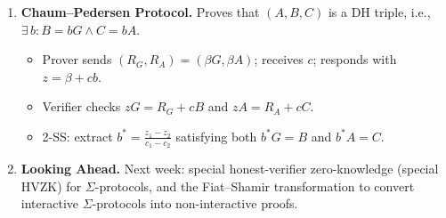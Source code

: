 \documentclass[11pt]{article}
\theoremstyle{plain}
\theoremstyle{definition}
\begin{document}
\begin{tcolorbox}[colback=blue!5!white, colframe=blue!60!black, title={Lecture Summary}]
\begin{enumerate}
  \item \textbf{Chaum--Pedersen Protocol.} Proves that $(A, B, C)$ is a DH triple, i.e., $\exists\, b: B = bG \wedge C = bA$.
    \begin{itemize}
      \item Prover sends $(R_G, R_A) = (\beta G, \beta A)$; receives $c$; responds with $z = \beta + cb$.
      \item Verifier checks $zG = R_G + cB$ and $zA = R_A + cC$.
      \item 2-SS: extract $b^* = \frac{z_1 - z_2}{c_1 - c_2}$ satisfying both $b^*G = B$ and $b^*A = C$.
    \end{itemize}

  \item \textbf{Looking Ahead.} Next week: special honest-verifier zero-knowledge (special HVZK) for $\Sigma$-protocols, and the Fiat--Shamir transformation to convert interactive $\Sigma$-protocols into non-interactive proofs.
\end{enumerate}
\end{tcolorbox}
\end{document}
